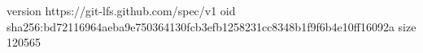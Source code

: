 version https://git-lfs.github.com/spec/v1
oid sha256:bd72116964aeba9e750364130fcb3efb1258231cc8348b1f9f6b4e10ff16092a
size 120565

